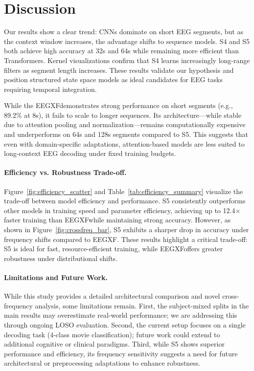 \documentclass{article}
\newcommand{\eegtrans}{EEGXF}
\begin{document}
\section{Discussion}
\label{sec:discussion}

Our results show a clear trend: CNNs dominate on short EEG segments, but as the context window increases, the advantage shifts to sequence models. S4 and S5 both achieve high accuracy at 32s and 64s while remaining more efficient than Transformers. Kernel visualizations confirm that S4 learns increasingly long-range filters as segment length increases. These results validate our hypothesis and position structured state space models as ideal candidates for EEG tasks requiring temporal integration.

While the \eegtrans demonstrates strong performance on short segments (e.g., 89.2\% at 8s), it fails to scale to longer sequences. Its architecture—while stable due to attention pooling and normalization—remains computationally expensive and underperforms on 64s and 128s segments compared to S5. This suggests that even with domain-specific adaptations, attention-based models are less suited to long-context EEG decoding under fixed training budgets.

\paragraph*{Efficiency vs. Robustness Trade-off.}
Figure~\ref{fig:efficiency_scatter} and Table~\ref{tab:efficiency_summary} visualize the trade-off between model efficiency and performance. S5 consistently outperforms other models in training speed and parameter efficiency, achieving up to 12.4× faster training than \eegtrans while maintaining strong accuracy. However, as shown in Figure~\ref{fig:crossfreq_bar}, S5 exhibits a sharper drop in accuracy under frequency shifts compared to \eegtrans. These results highlight a critical trade-off: S5 is ideal for fast, resource-efficient training, while \eegtrans offers greater robustness under distributional shifts.

\paragraph*{Limitations and Future Work.}
While this study provides a detailed architectural comparison and novel cross-frequency analysis, some limitations remain. First, the subject-mixed splits in the main results may overestimate real-world performance; we are addressing this through ongoing LOSO evaluation. Second, the current setup focuses on a single decoding task (4-class movie classification); future work could extend to additional cognitive or clinical paradigms. Third, while S5 shows superior performance and efficiency, its frequency sensitivity suggests a need for future architectural or preprocessing adaptations to enhance robustness.
\end{document}
